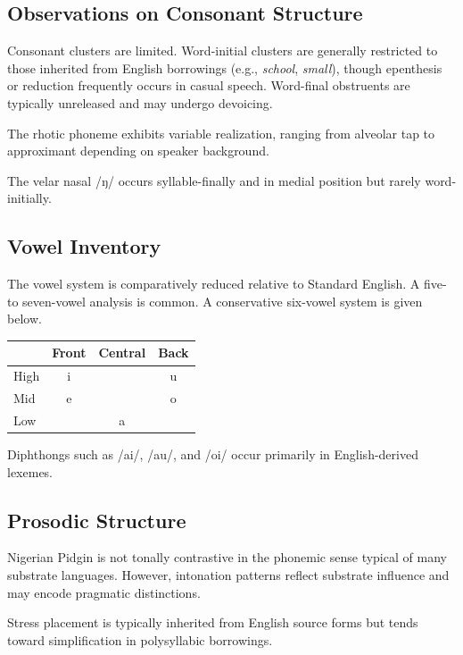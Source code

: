 \documentclass[12pt]{article}
\begin{document}
\subsection{Observations on Consonant Structure}

Consonant clusters are limited. Word-initial clusters are generally restricted to those inherited from English borrowings (e.g., \textit{school}, \textit{small}), though epenthesis or reduction frequently occurs in casual speech. Word-final obstruents are typically unreleased and may undergo devoicing.

The rhotic phoneme exhibits variable realization, ranging from alveolar tap to approximant depending on speaker background.

The velar nasal /ŋ/ occurs syllable-finally and in medial position but rarely word-initially.

\subsection{Vowel Inventory}

The vowel system is comparatively reduced relative to Standard English. A five- to seven-vowel analysis is common. A conservative six-vowel system is given below.

\begin{center}
\begin{tabular}{lccc}
 & Front & Central & Back \\ \hline
High & i &  & u \\
Mid & e &  & o \\
Low &  & a &  \\
\end{tabular}
\end{center}

Diphthongs such as /ai/, /au/, and /oi/ occur primarily in English-derived lexemes.

\subsection{Prosodic Structure}

Nigerian Pidgin is not tonally contrastive in the phonemic sense typical of many substrate languages. However, intonation patterns reflect substrate influence and may encode pragmatic distinctions.

Stress placement is typically inherited from English source forms but tends toward simplification in polysyllabic borrowings.
\end{document}
